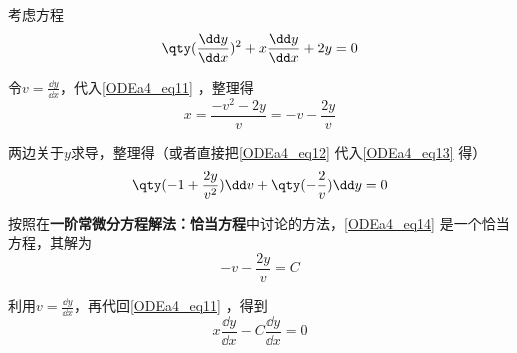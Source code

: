 \begin{example}{}
考虑方程
\begin{equation}\label{ODEa4_eq11}
\qty(\frac{\dd y}{\dd x})^2+x\frac{\dd y}{\dd x}+2y=0
\end{equation}

令$v=\frac{\dd y}{\dd x}$，代入\autoref{ODEa4_eq11} ，整理得
\begin{equation}\label{ODEa4_eq12}
x=\frac{-v^2-2y}{v}=-v-\frac{2y}{v}
\end{equation}



两边关于$y$求导，整理得（或者直接把\autoref{ODEa4_eq12} 代入\autoref{ODEa4_eq13} 得）
\begin{equation}\label{ODEa4_eq14}
\qty(-1+\frac{2y}{v^2})\dd v+\qty(-\frac{2}{v})\dd y=0
\end{equation}

按照在\textbf{一阶常微分方程解法：恰当方程}中讨论的方法，\autoref{ODEa4_eq14} 是一个恰当方程，其解为
\begin{equation}
-v-\frac{2y}{v}=C
\end{equation}

利用$v=\frac{\dd y}{\dd x}$，再代回\autoref{ODEa4_eq11} ，得到
\begin{equation}
x\frac{\dd y}{\dd x}-C\frac{\dd y}{\dd x}=0
\end{equation}


\end{example}





















